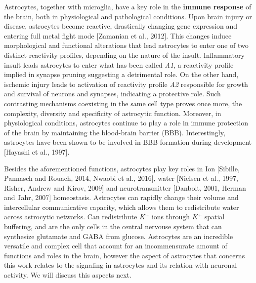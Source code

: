 Astrocytes, together with microglia, have a key role in the \textbf{immune response} of the brain, both in physiological and pathological conditions.
Upon brain injury or disease, astrocytes become reactive, drastically changing gene expression and entering full metal fight mode [Zamanian et al., 2012].
This changes induce morphological and functional alterations that lead astrocytes to enter one of two distinct reactivity profiles, depending on the nature of the insult. 
Inflammatory insult leads astrocytes to enter what has been called \textit{A1}, a reactivity profile implied in synapse pruning suggesting a detrimental role.
On the other hand, ischemic injury leads to activation of reactivity profile \textit{A2} responsible for growth and survival of neurons and synapses, indicating a protective role. 
Such contrasting mechanisms coexisting in the same cell type proves once more, the complexity, diversity and specificity of astrocytic function. 
Moreover, in physiological conditions, astrocytes continue to play a role in immune protection of the brain by maintaining the blood-brain barrier (BBB). 
Interestingly, astrocytes have been shown to be involved in BBB formation during development [Hayashi et al., 1997]. 

Besides the aforementioned functions, astrocytes play key roles in Ion [Sibille, Pannasch and Rouach, 2014, Nwaobi et al., 2016], water [Nielsen et al., 1997, Risher, Andrew and Kirov, 2009] and neurotransmitter [Danbolt, 2001, Herman and Jahr, 2007] homeostasis. 
Astrocytes can rapidly change their volume and intercellular communicative capacity, which allows them to redistribute water across astrocytic networks.  
Can redistribute $K^+$ ions through $K^+$ spatial buffering, and are the only cells in the central nervouse system that can synthesize glutamate and GABA from glucose. 
Astrocytes are an incredible versatile and complex cell that account for an incommensurate amount of functions and roles in the brain, however the aspect of astrocytes that concerns this work relates to the signaling in astrocytes and its relation with neuronal activity. 
We will discuss this aspects next. 

